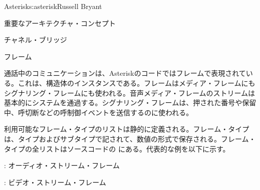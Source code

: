 \begin{aosachapter}{Asterisk}{s:asterisk}{Russell Bryant}
\begin{aosasect1}{重要なアーキテクチャ・コンセプト}
\begin{aosasect2}{チャネル・ブリッジ}

\end{aosasect2}

\begin{aosasect2}{フレーム}

通話中のコミュニケーションは、Asteriskのコードではフレームで表現されている。これは、構造体のインスタンスである。フレームはメディア・フレームにもシグナリング・フレームにも使われる。音声メディア・フレームのストリームは基本的にシステムを通過する。シグナリング・フレームは、押された番号や保留中、呼切断などの呼制御イベントを送信するのに使われる。

利用可能なフレーム・タイプのリストは静的に定義される。フレーム・タイプは、タイプおよびサブタイプで記されて、数値の形式で保存される。フレーム・タイプの全リストはソースコードの にある。代表的な例を以下に示す。

\begin{aosaitemize}

  \item {}: オーディオ・ストリーム・フレーム

  \item {}: ビデオ・ストリーム・フレーム


\end{aosaitemize}
\end{aosasect2}
\end{aosasect1}
\end{aosachapter}
